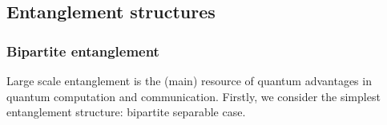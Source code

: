 \documentclass[
aps,
pra,
floatfix,
]{revtex4-2}
\theoremstyle{plain}
\theoremstyle{definition}
\newtheorem{definition}{Definition}
\newcommand{\dm}{\rho}
\begin{document}
\subsection{Entanglement structures}

\subsubsection{Bipartite entanglement}
Large scale entanglement is the (main) resource of quantum advantages in quantum computation and communication.
Firstly, we consider the simplest entanglement structure: bipartite separable case.
\end{document}
